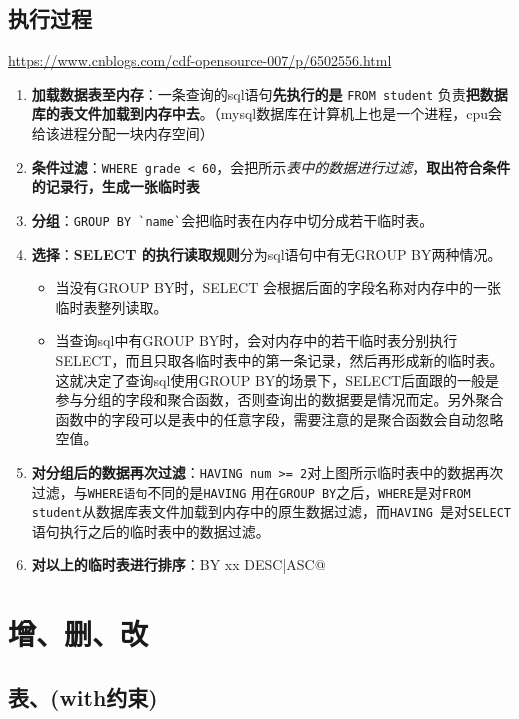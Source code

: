 \documentclass[UTF8,a4paper,12pt]{ctexbook}
\begin{document}
	\section{执行过程}
		\url{https://www.cnblogs.com/cdf-opensource-007/p/6502556.html}
		
		\begin{enumerate}
			\item \textbf{加载数据表至内存}：一条查询的sql语句\textbf{先执行的是} \verb|FROM student| 负责\textbf{把数据库的表文件加载到内存中去}。（mysql数据库在计算机上也是一个进程，cpu会给该进程分配一块内存空间）
			\item \textbf{条件过滤}：\verb|WHERE grade < 60|，会把所示\textit{表中的数据进行过滤}，\textbf{取出符合条件的记录行，生成一张临时表}
			\item \textbf{分组}：\verb|GROUP BY `name`|会把临时表在内存中切分成若干临时表。
			\item \textbf{选择}：\textbf{SELECT 的执行读取规则}分为sql语句中有无GROUP BY两种情况。
				\begin{itemize}
					\item 当没有GROUP BY时，SELECT 会根据后面的字段名称对内存中的一张临时表整列读取。
					\item 当查询sql中有GROUP BY时，会对内存中的若干临时表分别执行SELECT，而且只取各临时表中的第一条记录，然后再形成新的临时表。这就决定了查询sql使用GROUP BY的场景下，SELECT后面跟的一般是参与分组的字段和聚合函数，否则查询出的数据要是情况而定。另外聚合函数中的字段可以是表中的任意字段，需要注意的是聚合函数会自动忽略空值。
				\end{itemize}
			\item \textbf{对分组后的数据再次过滤}：\verb|HAVING num >= 2|对上图所示临时表中的数据再次过滤，与\verb|WHERE语句|不同的是\verb|HAVING| 用在\verb|GROUP BY|之后，\verb|WHERE|是对\verb|FROM student|从数据库表文件加载到内存中的原生数据过滤，而\verb|HAVING |是对\verb|SELECT |语句执行之后的临时表中的数据过滤。
			\item \textbf{对以上的临时表进行排序}：\verb@ORDER BY xx DESC|ASC@
		\end{enumerate}
		
				
		
\chapter{增、删、改}
	\section{表、(with约束)}
\end{document}
